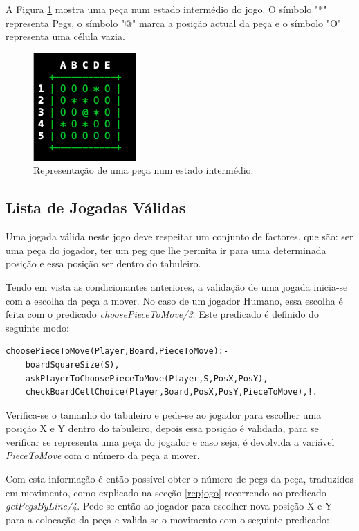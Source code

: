 \documentclass[paper=a4, fontsize=11pt]{scrartcl} %
\numberwithin{equation}{section} %
\numberwithin{figure}{section} %
\numberwithin{table}{section} %
\begin{document}
A Figura \ref{fig:pieceRepresentation} mostra uma peça num estado intermédio do jogo. O símbolo "*" representa Pegs, o símbolo "@" marca a posição actual da peça e o símbolo "O" representa uma célula vazia.

\begin{figure}[tb]
	\centering
	\includegraphics{piece_representation}
	\caption[PROLOG: tabuleiro estado final]{Representação de uma peça num estado intermédio.} %
	\label{fig:pieceRepresentation} 
\end{figure}


\subsection{Lista de Jogadas Válidas}  \label{validmoves}

Uma jogada válida neste jogo deve respeitar um conjunto de factores, que são: ser uma peça do jogador, ter um peg que lhe permita ir para uma determinada posição e essa posição ser dentro do tabuleiro.

Tendo em vista as condicionantes anteriores, a validação de uma jogada inicia-se com a escolha da peça a mover. No caso de um jogador Humano, essa escolha é feita com o predicado \textit{choosePieceToMove/3}. Este predicado é definido do seguinte modo:

\begin{lstlisting}
choosePieceToMove(Player,Board,PieceToMove):-
	boardSquareSize(S),
	askPlayerToChoosePieceToMove(Player,S,PosX,PosY),
	checkBoardCellChoice(Player,Board,PosX,PosY,PieceToMove),!.
\end{lstlisting}

Verifica-se o tamanho do tabuleiro e pede-se ao jogador para escolher uma posição X e Y dentro do tabuleiro, depois essa posição é validada, para se verificar se representa uma peça do jogador e caso seja, é devolvida a variável \textit{PieceToMove} com o número da peça a mover.

Com esta informação é então possível obter o número de pegs da peça, traduzidos em movimento, como explicado na secção \ref{repjogo} recorrendo ao predicado \textit{getPegsByLine/4}. Pede-se então ao jogador para escolher nova posição X e Y para a colocação da peça e valida-se o movimento com o seguinte predicado:
\end{document}
